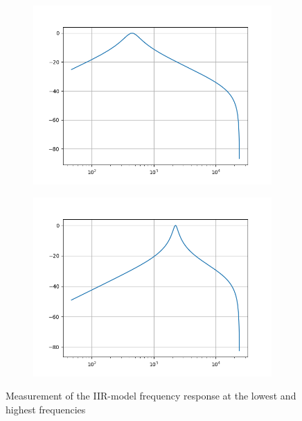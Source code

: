 \begin{figure}[!h]
    \centering
    \begin{subfigure}[c]{0.49\textwidth}
        \centering
        \includegraphics[width=\textwidth]{img/iir_bandpass460.png}
    \end{subfigure}
    \begin{subfigure}[c]{0.49\textwidth}
        \centering
        \includegraphics[width=\textwidth]{img/iir_bandpass2242.png}
    \end{subfigure}
    \caption{Measurement of the \ac{IIR}-model frequency response at the lowest and highest frequencies}
    \label{fig:wahwah-iir}
\end{figure}

